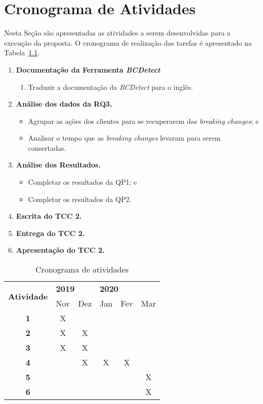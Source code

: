 \chapter{Cronograma de Atividades}
\label{cap:cronograma}

Nesta Seção são apresentadas as atividades a serem desenvolvidas para a execução da proposta. O cronograma de realização das tarefas é apresentado na Tabela~\ref{tab:cronograma}.

\begin{enumerate}
\item \textbf{Documentação da Ferramenta \textit{BCDetect}}
    \begin{enumerate}
        \item Traduzir a documentação da \textit{BCDetect} para o inglês.
    \end{enumerate}{}
\item \textbf{Análise dos dados da RQ3.}
    \begin{itemize}
        \item Agrupar as ações dos clientes para se recuperarem das \textit{breaking changes}; e
        \item Analisar o tempo que as \textit{breaking changes} levaram para serem consertadas.
    \end{itemize}{}
\item \textbf{Análise dos Resultados.}
    \begin{itemize}
        \item Completar os resultados da QP1; e
        \item Completar os resultados da QP2.
    \end{itemize}{}
\item \textbf{Escrita do TCC 2.}
\item \textbf{Entrega do TCC 2.}
\item \textbf{Apresentação do TCC 2.}
\end{enumerate}

\begin{table}[h!]
\centering
\renewcommand{\arraystretch}{1.3}
\caption{Cronograma de atividades}
\label{tab:cronograma}
\begin{tabular}{|c|c|c|c|c|c|}
\hline
\multirow{2}{*}{\textbf{Atividade}} & \multicolumn{2}{l|}{\textbf{2019}} & \multicolumn{3}{l|}{\textbf{2020}} \\ \cline{2-6} 
             & Nov & Dez & Jan & Fev & Mar \\ \hline
\textbf{1}   &  X  &     &     &     &     \\ \hline
\textbf{2}   &  X  &  X  &     &     &     \\ \hline
\textbf{3}   &  X  &  X  &     &     &     \\ \hline
\textbf{4}   &     &  X  &  X  &  X  &     \\ \hline
\textbf{5}   &     &     &     &     &  X  \\ \hline
\textbf{6}   &     &     &     &     &  X  \\ \hline
\end{tabular}
\end{table}